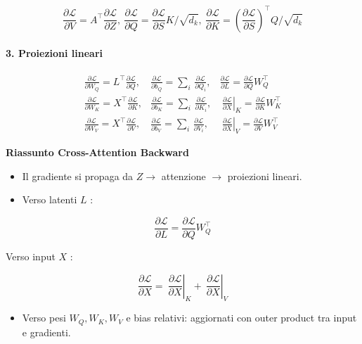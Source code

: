 \documentclass[
  11pt,
]{article}
\begin{document}
\[\frac{\partial\mathcal{L}}{\partial V} = A^{\top}\frac{\partial\mathcal{L}}{\partial Z},\ \frac{\partial\mathcal{L}}{\partial Q} = \frac{\partial\mathcal{L}}{\partial S}K/\sqrt{d_{k}},\ \frac{\partial\mathcal{L}}{\partial K} = \left( \frac{\partial\mathcal{L}}{\partial S} \right)^{\top}Q/\sqrt{d_{k}}\]

\paragraph{3. Proiezioni lineari}

\[\begin{matrix}
\frac{\partial\mathcal{L}}{\partial W_{Q}} = L^{\top}\frac{\partial\mathcal{L}}{\partial Q}, & \frac{\partial\mathcal{L}}{\partial b_{Q}} = \sum_{i}^{}\,\frac{\partial\mathcal{L}}{\partial Q_{i}}, & \frac{\partial\mathcal{L}}{\partial L} = \frac{\partial\mathcal{L}}{\partial Q}W_{Q}^{\top} \\
\frac{\partial\mathcal{L}}{\partial W_{K}} = X^{\top}\frac{\partial\mathcal{L}}{\partial K}, & \frac{\partial\mathcal{L}}{\partial b_{K}} = \sum_{i}^{}\,\frac{\partial\mathcal{L}}{\partial K_{i}}, & \left. \ \frac{\partial\mathcal{L}}{\partial X} \right|_{K} = \frac{\partial\mathcal{L}}{\partial K}W_{K}^{\top} \\
\frac{\partial\mathcal{L}}{\partial W_{V}} = X^{\top}\frac{\partial\mathcal{L}}{\partial V}, & \frac{\partial\mathcal{L}}{\partial b_{V}} = \sum_{i}^{}\,\frac{\partial\mathcal{L}}{\partial V_{i}}, & \left. \ \frac{\partial\mathcal{L}}{\partial X} \right|_{V} = \frac{\partial\mathcal{L}}{\partial V}W_{V}^{\top}
\end{matrix}\]

\textbf{Riassunto Cross-Attention Backward}

\begin{itemize}
\item
  Il gradiente si propaga da \(Z \rightarrow\) attenzione
  \(\rightarrow\) proiezioni lineari.
\item
  Verso latenti \(L\) :
\end{itemize}

\[\frac{\partial\mathcal{L}}{\partial L} = \frac{\partial\mathcal{L}}{\partial Q}W_{Q}^{\top}\]

Verso input \(X\) :

\[\frac{\partial\mathcal{L}}{\partial X} = \left. \ \frac{\partial\mathcal{L}}{\partial X} \right|_{K} + \left. \ \frac{\partial\mathcal{L}}{\partial X} \right|_{V}\]

\begin{itemize}
\item
  Verso pesi \(W_{Q},W_{K},W_{V}\) e bias relativi: aggiornati con outer
  product tra input e gradienti.
\end{itemize}
\end{document}
